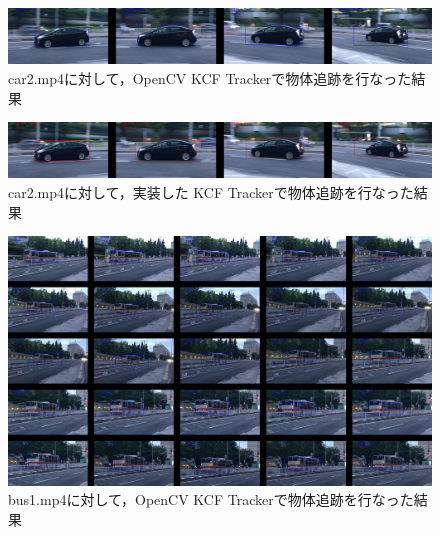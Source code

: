 \documentclass[11pt,a4j]{jarticle}
\begin{document}
    \begin{figure}[hbtp]
      \begin{center}
        \includegraphics[clip,width=12.5cm]{./figures/car2_kcf_opencv.jpg}
        \caption{car2.mp4に対して，OpenCV KCF Trackerで物体追跡を行なった結果}
        \label{fig:AC_PetriNet}
      \end{center}
    \end{figure}

    \begin{figure}[hbtp]
      \begin{center}
        \includegraphics[clip,width=12.5cm]{./figures/car2_kcf_impl.jpg}
        \caption{car2.mp4に対して，実装した KCF Trackerで物体追跡を行なった結果}
        \label{fig:AC_PetriNet}
      \end{center}
    \end{figure}

    \begin{figure}[hbtp]
      \begin{center}
        \includegraphics[clip,width=12.5cm]{./figures/bus1_kcf_opencv.jpg}
        \caption{bus1.mp4に対して，OpenCV KCF Trackerで物体追跡を行なった結果}
        \label{fig:AC_PetriNet}
      \end{center}
    \end{figure}
\end{document}
